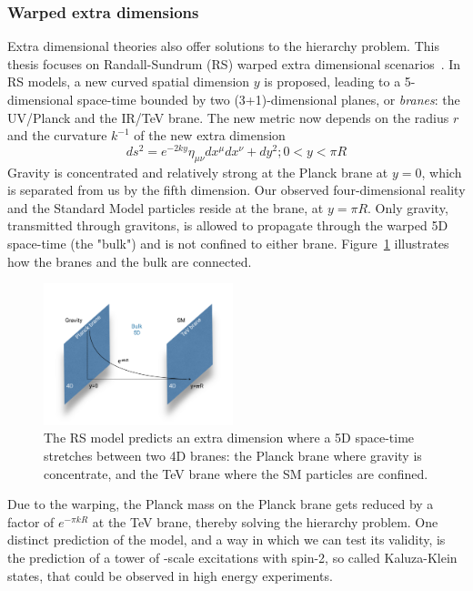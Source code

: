 \subsubsection{Warped extra dimensions}
\label{sec:theory:wed}
Extra dimensional theories also offer solutions to the hierarchy problem. This thesis focuses on Randall-Sundrum (RS) warped extra dimensional scenarios~\cite{PhysRevLett.83.3370}. In RS models, a new curved spatial dimension $y$ is proposed, leading to a 5-dimensional space-time bounded by two (3+1)-dimensional planes, or \emph{branes}: the UV/Planck and the IR/TeV brane. The new metric now depends on the radius $r$ and the curvature $k^{-1}$ of the new extra dimension
\begin{equation}
  ds^2=e^{-2ky}\eta_{\mu\nu}dx^{\mu}dx^{\nu}+dy^2; 0 < y < \pi R
\end{equation}
Gravity is concentrated and relatively strong at the Planck brane at $y=0$, which is separated from us by the fifth dimension. Our observed four-dimensional reality and the Standard Model particles reside at the \TeV brane, at $y=\pi R$. Only gravity, transmitted through gravitons, is allowed to propagate through the warped 5D space-time (the "bulk") and is not confined to either brane. Figure~\ref{fig:theory:rs1} illustrates how the branes and the bulk are connected.
\begin{figure}[h!]
\centering
\includegraphics[width=0.49\textwidth]{figures/theory/rs1.pdf}
\caption{The RS model predicts an extra dimension where a 5D space-time stretches between two 4D branes: the Planck brane where gravity is concentrate, and the TeV brane where the SM particles are confined.}
\label{fig:theory:rs1}
\end{figure}
 Due to the warping, the Planck mass on the Planck brane gets reduced by a factor of $e^{-\pi kR}$ at the TeV brane, thereby solving the hierarchy problem. One distinct prediction of the model, and a way in which we can test its validity, is the prediction of a tower of \TeV-scale excitations with spin-2, so called Kaluza-Klein states, that could be observed in high energy experiments. \newline
